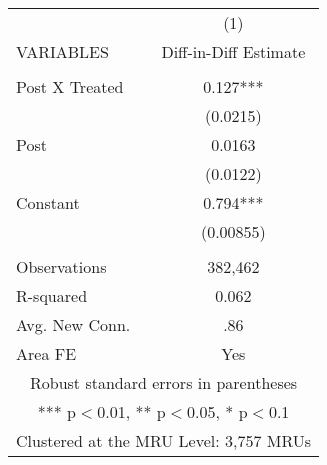 \begin{tabular}{lc} \hline
 & (1) \\
VARIABLES & Diff-in-Diff Estimate \\ \hline
 &  \\
Post X Treated & 0.127*** \\
 & (0.0215) \\
Post & 0.0163 \\
 & (0.0122) \\
Constant & 0.794*** \\
 & (0.00855) \\
 &  \\
Observations & 382,462 \\
R-squared & 0.062 \\
Avg. New Conn. & .86 \\
 Area FE & Yes \\ \hline
\multicolumn{2}{c}{ Robust standard errors in parentheses} \\
\multicolumn{2}{c}{ *** p$<$0.01, ** p$<$0.05, * p$<$0.1} \\
\multicolumn{2}{c}{ Clustered at the MRU Level: 3,757 MRUs} \\
\end{tabular}
